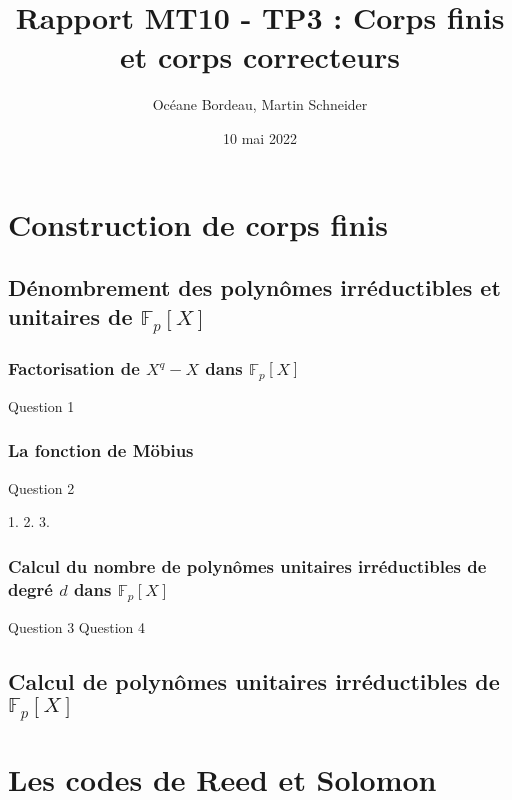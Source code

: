 \documentclass[titlepage]{article}
\title{Rapport MT10 - TP3 : Corps finis et corps correcteurs}
\author{Océane Bordeau, Martin Schneider}
\date{10 mai 2022}
\begin{document}
    \maketitle
    \tableofcontents
    \pagebreak

    \section{Construction de corps finis}
        \setcounter{subsection}{2}
        \subsection{Dénombrement des polynômes irréductibles et unitaires de $\mathbb{F}_p[X]$}
            \subsubsection{Factorisation de $X^q-X$ dans $\mathbb{F}_p[X]$}
            Question 1
            \subsubsection{La fonction de Möbius}
            Question 2

            1.
            2.
            3.
            \subsubsection{Calcul du nombre de polynômes unitaires irréductibles de degré $d$ dans $\mathbb{F}_p[X]$}
            Question 3
            Question 4
        \subsection{Calcul de polynômes unitaires irréductibles de $\mathbb{F}_p[X]$}
    
    \section{Les codes de Reed et Solomon}
\end{document}
